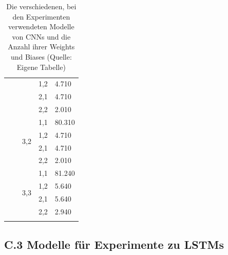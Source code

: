 \documentclass[
	a4paper,
	12pt,
	ngerman,
	oneside
]{scrreprt}											%
\begin{document}
\begin{footnotesize}
\begin{longtable}[l]{|l|p{60mm}|l|l|l|}
						& &                     & 1,2    & 4.710                         \\ \cline{4-5} 
						& &                     & 2,1    & 4.710                         \\ \cline{4-5} 
						& &                     & 2,2    & 2.010                         \\ \cline{3-5} 
						& & \multirow[t]{4}{*}[\shiftdown]{3,2} & 1,1    & 80.310                         \\ \cline{4-5} 
						& &                     & 1,2    & 4.710                         \\ \cline{4-5} 
						& &                     & 2,1    & 4.710                         \\ \cline{4-5} 
						& &                     & 2,2    & 2.010                         \\ \cline{3-5} 
						& & \multirow[t]{4}{*}[\shiftdown]{3,3} & 1,1    & 81.240                         \\ \cline{4-5} 
						& &                     & 1,2    & 5.640                         \\ \cline{4-5} 
						& &                     & 2,1    & 5.640                         \\ \cline{4-5} 
						& &                     & 2,2    & 2.940                         \\ \hline
						\caption{Die verschiedenen, bei den Experimenten verwendeten Modelle von CNNs und die Anzahl ihrer Weights und Biases (Quelle: Eigene Tabelle)}
					\end{longtable}
				\end{footnotesize}
	
			\newpage
			\subsection*{C.3 Modelle für Experimente zu LSTMs}
				
\end{document}
